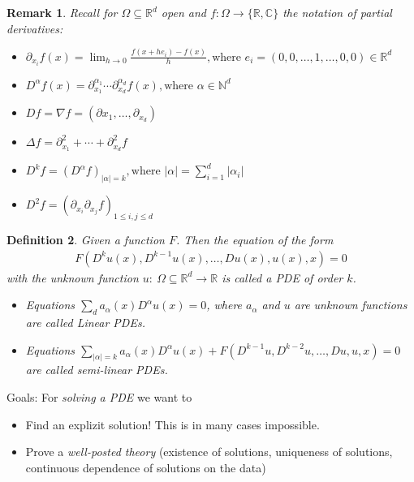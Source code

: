 \documentclass{report}
\theoremstyle{tommy}
\newtheorem{defn}{Definition}
\newtheorem{rem}[defn]{Remark}
\begin{document}
  \begin{rem}
    Recall for \( \Omega \subseteq \mathbb{R}^d\) open and \(f: \Omega \to \{\mathbb{R}, \mathbb{C}\}\) the notation of partial derivatives:
    \begin{itemize}
      \item \(\partial_{x_i} f(x) = \lim_{h \to 0} \frac{f(x + he_i) - f(x)}{h}, \text{where } e_i = (0, 0, \dots, 1, \dots, 0, 0) \in \mathbb{R}^d\)
      \item \(D^\alpha f(x) = \partial_{x_1}^{\alpha_1} \cdots \partial_{x_d}^{\alpha_d} f(x), \text{where } \alpha \in \mathbb{N}^d\)
      \item \(Df = \nabla f = (\partial{x_1}, \ldots, \partial_{x_d})\)
      \item \(\Delta f = \partial_{x_1}^2 + \cdots + \partial^2_{x_d} f\)
      \item \(D^k f = (D^\alpha f)_{|\alpha| = k},  \text{where } |\alpha| = \sum_{i=1}^d |\alpha_i|\)
      \item \(D^2 f = (\partial_{x_i} \partial_{x_j} f)_{1 \le i, j \le d}\)
    \end{itemize}
  \end{rem}

  \begin{defn}
    Given a function \( F \). Then the equation of the form 
    \begin{align*}
      F(D^k u(x), D^{k-1} u(x), \dots, Du(x), u(x), x) = 0 
    \end{align*}
    with the unknown function \(u:\ \Omega \subseteq \mathbb{R}^d \longrightarrow \mathbb{R}\) is called a \emph{PDE of order \(k\)}.
    \begin{itemize}
      \item Equations \(\sum_d a_\alpha(x) D^\alpha u(x) = 0\), where \(a_\alpha\) and \(u\) are unknown functions are called \emph{Linear PDEs}. 
      \item Equations \(\sum_{|\alpha| = k} a_\alpha(x) D^\alpha u(x) + F(D^{k-1}u, D^{k-2}u, \dots, Du, u, x) = 0\) are called \emph{semi-linear PDEs}.
    \end{itemize}
  \end{defn}

  Goals: For \emph{solving a PDE} we want to
  \begin{itemize}
    \item Find an explizit solution! This is in many cases impossible.
    \item Prove a \emph{well-posted theory} (existence of solutions, uniqueness of solutions, continuous dependence of solutions on the data)
  \end{itemize}
\end{document}
